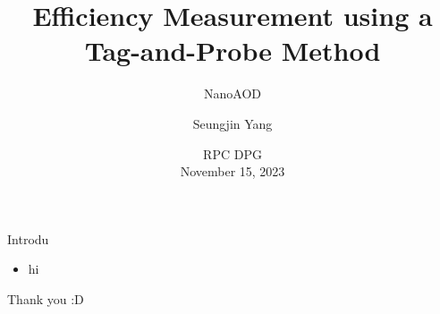 \documentclass[10pt]{beamer}
\title{Efficiency Measurement using a Tag-and-Probe Method}
\subtitle{NanoAOD}
\author{Seungjin Yang}
\institute{Kyung Hee University}
\date{
RPC DPG\\
November 15, 2023
}
\begin{document}
\maketitle

\begin{frame}[fragile]{Introdu}
  \begin{itemize}
    \item hi
  \end{itemize}
\end{frame}

\begin{frame}[standout]
  Thank you :D
\end{frame}
\end{document}
